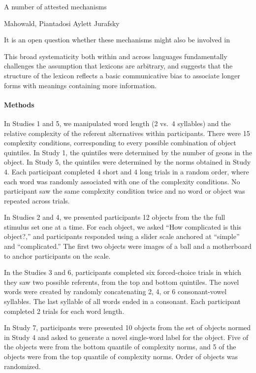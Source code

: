 \documentclass[12pt]{article}
\begin{document}
A number of attested mechanisms 

Mahowald, 
Piantadosi
Aylett 
Jurafsky

It is an open question whether these mechanisms might also be involved in 

This broad systematicity both within and across languages fundamentally challenges the assumption that lexicons are arbitrary, and suggests that the structure of the lexicon reflects a basic communicative bias to associate longer forms with meanings containing more information.

\paragraph*{Methods}
In Studies 1 and 5, we manipulated word length (2 vs.\ 4 syllables) and the relative complexity of the referent alternatives within participants. There were 15 complexity conditions, corresponding to every possible combination of object quintiles. In Study 1, the quintiles were determined by the number of geons in the object. In Study 5, the quintiles were determined by the norms obtained in Study 4. Each participant completed 4 short and 4 long trials in a random order, where each word was randomly associated with one of the complexity conditions. No participant saw the same complexity condition twice and no word or object was repeated across trials. 

In Studies 2 and 4, we presented participants 12 objects from the the full stimulus set one at a time. For each object, we asked ``How complicated is this object?,'' and participants responded using a slider scale anchored at ``simple'' and ``complicated.'' The first two objects were images of a ball and a motherboard to anchor participants on the scale.

In the Studies 3 and 6, participants completed six forced-choice trials in which they saw two possible referents, from the top and bottom quintiles. The novel words were created by randomly concatenating 2, 4, or 6 consonant-vowel syllables. The last syllable of all words ended in a consonant. Each participant completed 2 trials for each word length. 

In Study 7, participants were presented 10 objects from the set of objects normed in Study 4 and asked to generate a novel single-word label for the object. Five of the objects were from the bottom quantile of complexity norms, and 5 of the objects were from the top quantile of complexity norms. Order of objects was randomized.
\end{document}
